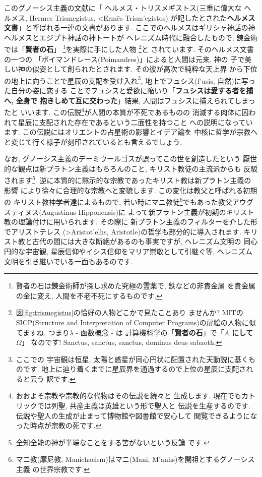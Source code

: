 このグノーシス主義の文献に「 ヘルメス・トリスメギストス(三重に偉大な
ヘルメス, Hermes Trismegistus, \textgreek{<Erm\~es Trism'egistos})
が記したとされた\textbf{ヘルメス文書}」と呼ばれる一連の文書があります.
 ここでのヘルメスはギリシャ神話の神ヘルメスとエジプト神話の神トートが
ヘレニズム時代に融合したもので, 錬金術では「\textbf{賢者の石}」
\footnote{賢者の石は錬金術師が探し求めた究極の霊薬で, 鉄などの非貴金属
を貴金属の金に変え, 人間を不老不死にするものです.}を実際に手にした人物
\footnote{図\ref{fig:trismegistus}の恰好の人物どこかで見たことあり
ませんか? MITのSICP(Structure and Interpretation of Computer
 Programs)の扉絵の人物に似てますね. つまり$\lambda$ - 函数概念 - は
計算機科学の「\textbf{賢者の石}」で「\textbf{$A$ にして $\Omega$}」
なのです! Sanctus, sanctus, sanctus, dominus deus sabaoth.}と
されています\cite{錬金術}. そのヘルメス文書の一つの
「ポイマンドレース(Poimandres)」\cite{柴田}によると人間は元来, 神の
子で美しい神の似姿として創られたとされます. その彼が高次で純粋な天上界
から下位の地上に向うことで星辰の支配を受け入れ\footnote{ここでの
宇宙観は恒星, 太陽と惑星が同心円状に配置された天動説に基くものです.
 地上に辿り着くまでに星辰界を通過するので上位の星辰に支配されると云う
訳です.}, 地上でフュシス(\textgreek{f'usis}, 自然)に写った自分の姿に恋する
ことでフュシスと愛欲に陥いり「\textbf{フュシスは愛する者を捕へ, 全身で
抱きしめて互に交わった}」結果, 人間はフュシスに捕えられてしまったと
いいます. この伝説\footnote{おおよそ宗教や宗教的な代物はその伝説を続々と
生成します. 現在でもカトリックでは列聖, 共産主義は英雄という形で聖人と
伝説を生産するのです. 伝説や聖人の生成が止まって博物館や図書館で安心して
閲覧できるようになった時点が宗教の死です.}が人間の本質が不死であるものの
消滅する肉体に囚われて星辰に支配された存在であるという二面性を持つこと
への説明になっています. この伝説にはオリエントの占星術の影響とイデア論を
中核に哲学が宗教へと変じて行く様子が刻印されているとも言えるでしょう.
\newline

なお, グノーシス主義のデーミウールゴスが誤ってこの世を創造したという
厭世的な観点は新プラトン主義はもちろんのこと, キリスト教徒の主流派からも
反駁されます\footnote{全知全能の神が半端なことをする筈がないという反論
です.}. 逆に本質的に黙示的な宗教であったキリスト教は新プラトン主義の影響
により徐々に合理的な宗教へと変貌します. この変化は教父と呼ばれる初期の
キリスト教神学者達によるもので, 若い時にマニ教徒\footnote{マニ教(摩尼教,
 Manichaeism)はマニ(Mani, \textgreek{M'anhs})を開祖とするグノーシス主義
の世界宗教です.}でもあった教父アウグスティヌス(Augustinus Hipponensis)に
よって新プラトン主義が初期のキリスト教の理論付けに用いられます. その際に
新プラトン主義のフィルターを介した形でアリストテレス
(\textgreek{>Aristot'elhs}, Aristotle)の哲学も部分的に導入されます.
 キリスト教と古代の間には大きな断絶があるのも事実ですが, ヘレニズム文明の
同心円的な宇宙観, 星辰信仰やイシス信仰をマリア崇敬として引継ぐ等,
 ヘレニズム文明を引き継いでいる一面もあるのです.
\newline

